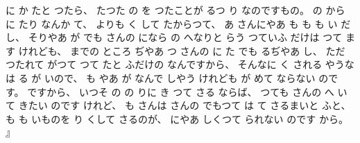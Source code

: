に
か
たと
つたら、
%
たつた
の
を
つたことが
るつ
り
なのですもの。
%
の
から
に
たり
なんか
て、
%
よりも
く
して
たからつて、
%
あ
さんにやあ
も
も
も
い
だし、
%
そりやあ
が
でも
さんの
になら
の
へなりと
らう
つていふ
だけは
つて
ます
けれども、
%
までの
ところ
ぢやあ
つ
さんの
に
た
でも
るぢやあ
し、
%
ただ%
つたれて
がつて
つて
たと
ふだけの
なんですから、
%
そんなに
く
される
やうな
は
る
が
いので、
%
も
やあ
が
なんで
しやう
けれども
が
めて
ならない
のです。
%
ですから、
%
いつそ
の
の
りに
き
つて
さる
ならば、
%
つても
さんの
へ
いて
きたい
のです
けれど、
%
も
さんは
さんの
でもつて
は
て
さるまいと
ふと、
%
も
も
いものを
り
くして
さるのが、
%
にやあ
しくつて
られない
のです
から。
』


